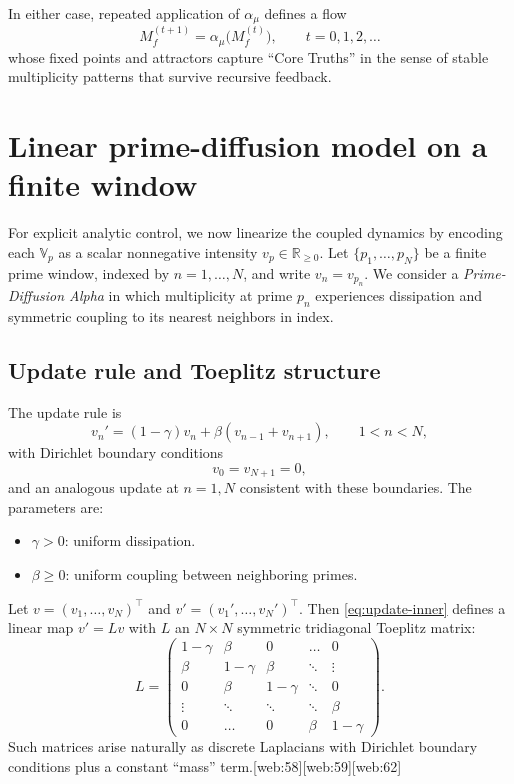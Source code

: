 \documentclass[11pt]{article}
\begin{document}
In either case, repeated application of $\alpha_\mu$ defines a flow
\begin{equation}
    M_f^{(t+1)} = \alpha_\mu\big(M_f^{(t)}\big), \qquad t = 0,1,2,\dots
\end{equation}
whose fixed points and attractors capture ``Core Truths'' in the sense of stable multiplicity patterns that survive recursive feedback.

\section{Linear prime-diffusion model on a finite window}

For explicit analytic control, we now linearize the coupled dynamics by encoding each $\mathbb{V}_p$ as a scalar nonnegative intensity $v_p \in \mathbb{R}_{\ge 0}$.
Let $\{p_1,\dots,p_N\}$ be a finite prime window, indexed by $n = 1,\dots,N$, and write $v_n = v_{p_n}$.
We consider a \emph{Prime-Diffusion Alpha} in which multiplicity at prime $p_n$ experiences dissipation and symmetric coupling to its nearest neighbors in index.

\subsection{Update rule and Toeplitz structure}

The update rule is
\begin{equation}
    v_n' = (1 - \gamma) v_n + \beta (v_{n-1} + v_{n+1}), \qquad 1 < n < N,
    \label{eq:update-inner}
\end{equation}
with Dirichlet boundary conditions
\begin{equation}
    v_0 = v_{N+1} = 0,
\end{equation}
and an analogous update at $n=1,N$ consistent with these boundaries.
The parameters are:
\begin{itemize}
    \item $\gamma > 0$: uniform dissipation.
    \item $\beta \ge 0$: uniform coupling between neighboring primes.
\end{itemize}

Let $v = (v_1,\dots,v_N)^\top$ and $v' = (v_1',\dots,v_N')^\top$.
Then \eqref{eq:update-inner} defines a linear map $v' = L v$ with $L$ an $N \times N$ symmetric tridiagonal Toeplitz matrix:
\begin{equation}
    L = 
    \begin{pmatrix}
        1-\gamma & \beta      & 0        & \dots  & 0 \\
        \beta      & 1-\gamma & \beta    & \ddots & \vdots \\
        0          & \beta      & 1-\gamma & \ddots & 0 \\
        \vdots     & \ddots   & \ddots   & \ddots & \beta \\
        0          & \dots    & 0        & \beta  & 1-\gamma
    \end{pmatrix}.
\end{equation}
Such matrices arise naturally as discrete Laplacians with Dirichlet boundary conditions plus a constant ``mass'' term.[web:58][web:59][web:62]
\end{document}
